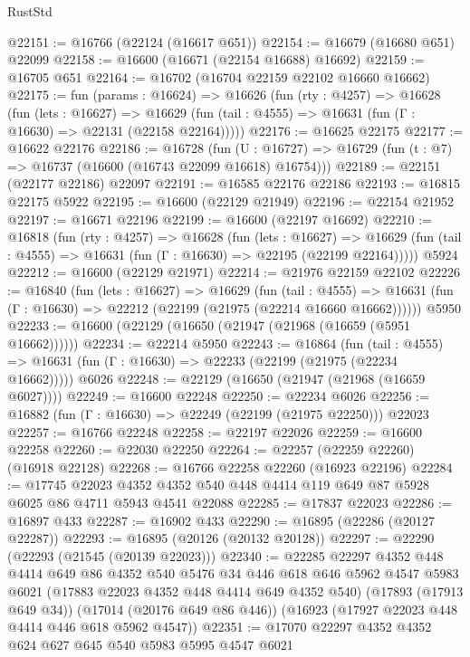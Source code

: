 \begin{lexlean}{RustStd}
\begin{coremodule}
@22151 := @16766 (@22124 (@16617 @651))
@22154 := @16679 (@16680 @651) @22099
@22158 := @16600 (@16671 (@22154 @16688) @16692)
@22159 := @16705 @651
@22164 := @16702 (@16704 @22159 @22102 @16660 @16662)
@22175 := fun (params : @16624) =>
  @16626
    (fun (rty : @4257) =>
    @16628
      (fun (lets : @16627) =>
      @16629 (fun (tail : @4555) => @16631 (fun (Γ : @16630) => @22131 (@22158 @22164)))))
@22176 := @16625 @22175
@22177 := @16622 @22176
@22186 := @16728
    (fun (U : @16727) => @16729 (fun (t : @7) => @16737 (@16600 (@16743 @22099 @16618) @16754)))
@22189 := @22151 (@22177 @22186) @22097
@22191 := @16585 @22176 @22186
@22193 := @16815 @22175 @5922
@22195 := @16600 (@22129 @21949)
@22196 := @22154 @21952
@22197 := @16671 @22196
@22199 := @16600 (@22197 @16692)
@22210 := @16818
    (fun (rty : @4257) =>
    @16628
      (fun (lets : @16627) =>
      @16629 (fun (tail : @4555) => @16631 (fun (Γ : @16630) => @22195 (@22199 @22164)))))
    @5924
@22212 := @16600 (@22129 @21971)
@22214 := @21976 @22159 @22102
@22226 := @16840
    (fun (lets : @16627) =>
    @16629
      (fun (tail : @4555) =>
      @16631 (fun (Γ : @16630) => @22212 (@22199 (@21975 (@22214 @16660 @16662))))))
    @5950
@22233 := @16600 (@22129 (@16650 (@21947 (@21968 (@16659 (@5951 @16662))))))
@22234 := @22214 @5950
@22243 := @16864
    (fun (tail : @4555) => @16631 (fun (Γ : @16630) => @22233 (@22199 (@21975 (@22234 @16662)))))
    @6026
@22248 := @22129 (@16650 (@21947 (@21968 (@16659 @6027))))
@22249 := @16600 @22248
@22250 := @22234 @6026
@22256 := @16882 (fun (Γ : @16630) => @22249 (@22199 (@21975 @22250))) @22023
@22257 := @16766 @22248
@22258 := @22197 @22026
@22259 := @16600 @22258
@22260 := @22030 @22250
@22264 := @22257 (@22259 @22260) (@16918 @22128)
@22268 := @16766 @22258 @22260 (@16923 @22196)
@22284 := @17745
    @22023
    @4352
    @4352
    @540
    @448
    @4414
    @119
    @649
    @87
    @5928
    @6025
    @86
    @4711
    @5943
    @4541
    @22088
@22285 := @17837 @22023
@22286 := @16897 @433
@22287 := @16902 @433
@22290 := @16895 (@22286 (@20127 @22287))
@22293 := @16895 (@20126 (@20132 @20128))
@22297 := @22290 (@22293 (@21545 (@20139 @22023)))
@22340 := @22285
    @22297
    @4352
    @448
    @4414
    @649
    @86
    @4352
    @540
    @5476
    @34
    @446
    @618
    @646
    @5962
    @4547
    @5983
    @6021
    (@17883 @22023 @4352 @448 @4414 @649 @4352 @540)
    (@17893 (@17913 @649 @34))
    (@17014 (@20176 @649 @86 @446))
    (@16923 (@17927 @22023 @448 @4414 @446 @618 @5962 @4547))
@22351 := @17070 @22297 @4352 @4352 @624 @627 @645 @540 @5983 @5995 @4547 @6021

\end{coremodule}
\end{lexlean}

